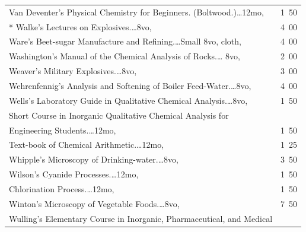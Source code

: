 \documentclass[a4paper,12pt]{book}[2004/02/16]
\theoremstyle{ilemma}
\theoremstyle{itheorem}
\theoremstyle{iother}
\theoremstyle{icorollary}
\theoremstyle{numcorollary}
\theoremstyle{idefinition}
\begin{document}
\begin{longtable}{@{}l@{ }r@{}}


Van Deventer's Physical Chemistry for
Beginners. (Boltwood.)\dotfill\ldots 12mo, &1\ 50\\

* Walke's Lectures on Explosives.\dotfill\ldots 8vo, &4\ 00\\

Ware's Beet-sugar Manufacture and Refining.\dotfill\ldots Small 8vo,
cloth, &4\ 00\\

Washington's Manual of the Chemical Analysis of Rocks.\dotfill\ldots
8vo, &2\ 00\\

Weaver's Military Explosives.\dotfill\ldots 8vo, &3\ 00 \\

Wehrenfennig's Analysis and Softening of Boiler
Feed-Water.\dotfill\ldots 8vo, &4\ 00 \\

Wells's Laboratory Guide in Qualitative Chemical
Analysis.\dotfill\ldots 8vo, &1\ 50 \\

\nopagebreak

\indent Short Course in Inorganic Qualitative Chemical Analysis for \\

\nopagebreak

\indent\indent Engineering Students.\dotfill\ldots 12mo, &1\ 50 \\

\nopagebreak

\indent Text-book of Chemical Arithmetic.\dotfill\ldots 12mo, &1\ 25 \\

Whipple's Microscopy of Drinking-water.\dotfill\ldots 8vo, &3\ 50 \\

Wilson's Cyanide Processes.\dotfill\ldots 12mo, &1\ 50 \\

\nopagebreak

\indent Chlorination Process.\dotfill\ldots 12mo, &1\ 50 \\

Winton's Microscopy of Vegetable Foods.\dotfill\ldots 8vo, &7\ 50 \\

Wulling's Elementary Course in Inorganic, Pharmaceutical, and Medical \\


\end{longtable}
\end{document}
